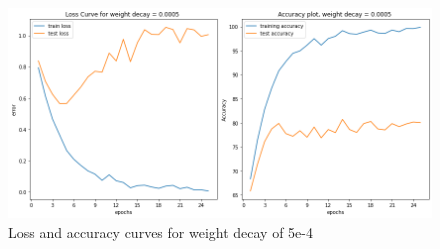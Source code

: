 \documentclass{article}
\begin{document}
\begin{figure}[ht]
	\centering
	\includegraphics[scale=0.3]{../code/images/decay0.0005.png}
	\caption{Loss and accuracy curves for weight decay of 5e-4}
	\label{fig:decay1}
\end{figure}
\end{document}
